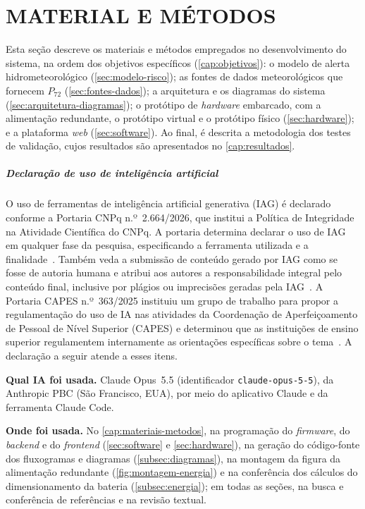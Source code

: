 \chapter{MATERIAL E MÉTODOS}
\label{cap:materiais-metodos}

Esta seção descreve os materiais e métodos empregados no
desenvolvimento do sistema, na ordem dos objetivos específicos
(\autoref{cap:objetivos}): o modelo de alerta hidrometeorológico
(\autoref{sec:modelo-risco}); as fontes de dados meteorológicos que
fornecem $P_{72}$ (\autoref{sec:fontes-dados}); a arquitetura e os
diagramas do sistema (\autoref{sec:arquitetura-diagramas}); o protótipo
de \textit{hardware} embarcado, com a alimentação redundante, o protótipo
virtual e o protótipo físico (\autoref{sec:hardware}); e a plataforma
\textit{web} (\autoref{sec:software}).
Ao final, é descrita a metodologia dos testes de validação, cujos
resultados são apresentados no \autoref{cap:resultados}.

\paragraph*{Declaração de uso de inteligência artificial}

O uso de ferramentas de inteligência artificial generativa (IAG) é
declarado conforme a Portaria CNPq n.º~2.664/2026, que institui a
Política de Integridade na Atividade Científica do CNPq. A portaria
determina declarar o uso de IAG em qualquer fase da pesquisa,
especificando a ferramenta utilizada e a finalidade~\cite[art.~9º, I, c]{cnpq2026portaria2664}. Também veda a submissão de
conteúdo gerado por IAG como se fosse de autoria humana e atribui aos
autores a responsabilidade integral pelo conteúdo final, inclusive por
plágios ou imprecisões geradas pela IAG~\cite[art.~9º, I, d, f]{cnpq2026portaria2664}. A Portaria CAPES
n.º~363/2025 instituiu um grupo de trabalho para propor a regulamentação
do uso de IA nas atividades da Coordenação de Aperfeiçoamento de Pessoal
de Nível Superior (CAPES) e determinou que as instituições de ensino
superior regulamentem internamente as orientações específicas sobre o
tema~\cite[art.~1º e art.~3º, parágrafo único]{capes2025portaria363}.
A declaração a seguir atende a esses itens.

\textbf{Qual IA foi usada.} Claude Opus~5.5 (identificador \texttt{claude-opus-5-5}),
da Anthropic PBC (São Francisco, EUA), por meio do aplicativo Claude e da
ferramenta Claude Code.

\textbf{Onde foi usada.} No \autoref{cap:materiais-metodos}, na
programação do \textit{firmware}, do \textit{backend} e do
\textit{frontend} (\autoref{sec:software} e \autoref{sec:hardware}), na
geração do código-fonte dos fluxogramas e diagramas
(\autoref{subsec:diagramas}), na montagem da figura da alimentação
redundante (\autoref{fig:montagem-energia}) e na conferência dos
cálculos do dimensionamento da bateria (\autoref{subsec:energia}); em todas as
seções, na busca e conferência de referências e na revisão textual.

